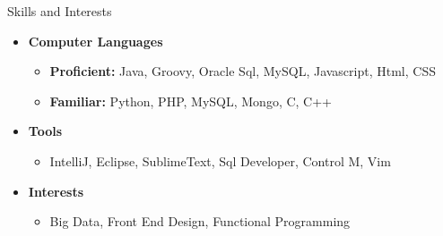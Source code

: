 \documentclass[11pt.oneside]{article}
\newenvironment{ressection}[1]{
    \vspace{4pt}
    {\fontfamily{phv}\selectfont\Large#1}
    \begin{itemize}
    \vspace{3pt} 
}{
    \end{itemize}
}
\newcommand{\resitem}[1]{
    \vspace{-4pt}
    \item \begin{flushleft}#1 \end{flushleft}
}
\newcommand{\ressubitem}[1]{
    \vspace{-1pt}
    \item \begin{flushleft}#1 \end{flushleft}
}
\newenvironment{reslist}[1]{
    \resitem{\textbf{#1}}
    \vspace{-5pt}
    \begin{itemize}
}{
    \end{itemize}
}
\begin{document}
\begin{ressection}{Skills and Interests}
    \begin{reslist}{Computer Languages}
        \ressubitem{\textbf{Proficient:} Java, Groovy, Oracle Sql, MySQL, Javascript, Html, CSS}
        \ressubitem{\textbf{Familiar:} Python, PHP, MySQL, Mongo, C, C++}
    \end{reslist}
    \begin{reslist}{Tools}
        \ressubitem{IntelliJ, Eclipse, SublimeText, Sql Developer, Control M, Vim}
    \end{reslist}
    \begin{reslist}{Interests}
        \ressubitem{Big Data, Front End Design, Functional Programming}
    \end{reslist}
\end{ressection}
\end{document}
